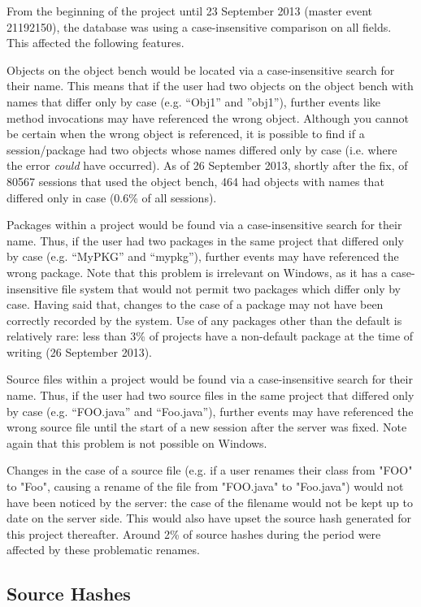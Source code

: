 \documentclass{report}
\begin{document}
From the beginning of the project until 23 September 2013 (master event 21192150), the database was using a case-insensitive comparison on all fields.  This affected the following features.

Objects on the object bench would be located via a case-insensitive search for their name.  This means that if the user had two objects on the object bench with names that differ only by case (e.g. ``Obj1'' and ''obj1''), further events like method invocations may have referenced the wrong object.  Although you cannot be certain when the wrong object is referenced, it is possible to find if a session/package had two objects whose names differed only by case (i.e. where the error \textit{could} have occurred).  As of 26 September 2013, shortly after the fix, of 80567 sessions that used the object bench, 464 had objects with names that differed only in case (0.6\% of all sessions).

Packages within a project would be found via a case-insensitive search for their name.  Thus, if the user had two packages in the same project that differed only by case (e.g. ``MyPKG'' and ``mypkg''), further events may have referenced the wrong package.  Note that this problem is irrelevant on Windows, as it has a case-insensitive file system that would not permit two packages which differ only by case.  Having said that, changes to the case of a package may not have been correctly recorded by the system.  Use of any packages other than the default is relatively rare: less than 3\% of projects have a non-default package at the time of writing (26 September 2013).

Source files within a project would be found via a case-insensitive search for their name.  Thus, if the user had two source files in the same project that differed only by case (e.g. ``FOO.java'' and ``Foo.java''), further events may have referenced the wrong source file until the start of a new session after the server was fixed.  Note again that this problem is not possible on Windows.

Changes in the case of a source file (e.g. if a user renames their class from "FOO" to "Foo", causing a rename of the file from "FOO.java" to "Foo.java") would not have been noticed by the server: the case of the filename would not be kept up to date on the server side.  This would also have upset the source hash generated for this project thereafter.  Around 2\% of source hashes during the period were affected by these problematic renames.

\subsection{Source Hashes}
\end{document}
